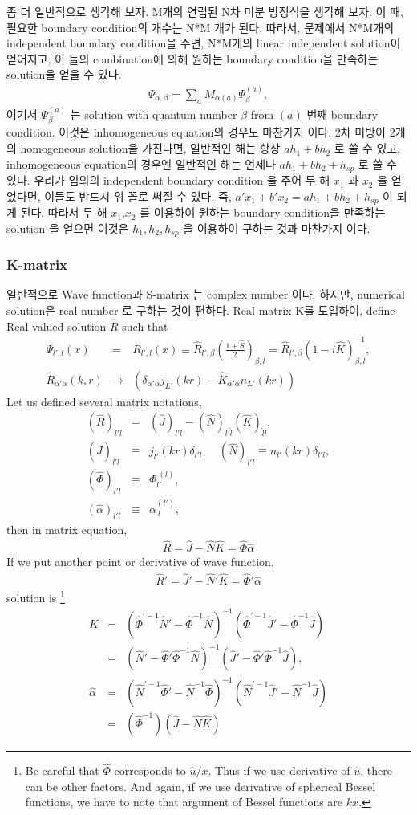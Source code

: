 \documentclass[10pt]{book}
\newcommand{\bea}{\begin{eqnarray}}
\newcommand{\eea}{\end{eqnarray}}
\newcommand{\no}{\nonumber \\}
\begin{document}
좀 더 일반적으로 생각해 보자. M개의 연립된 N차 미분 방정식을 생각해 보자. 이 때, 필요한 
boundary condition의 개수는 N*M 개가 된다. 따라서, 문제에서 N*M개의 independent boundary 
condition을 주면, N*M개의 linear independent solution이 얻어지고, 이 들의 combination에 의해
원하는 boundary condition을 만족하는 solution을 얻을 수 있다. 
\bea 
\Psi_{\alpha,\beta}=\sum_{a} M_{\alpha (a)} \Psi^{(a)}_{\beta} ,
\eea 
여기서 $\Psi^{(a)}_{\beta}$ 는 solution with quantum number $\beta $
from $(a)$ 번째 boundary condition. 
이것은 inhomogeneous equation의 경우도 마찬가지 이다. 
2차 미방이 2개의 homogeneous solution을 가진다면, 일반적인 해는 항상 
$a h_1+ b h_2$ 로 쓸 수 있고, inhomogeneous equation의 경우엔
일반적인 해는 언제나 $a h_1+ b h_2+ h_{sp}$ 로 쓸 수 있다. 
우리가 임의의 independent boundary condition 을 주어 두 해 
$x_1$ 과 $x_2$ 을 얻었다면, 이들도 반드시 위 꼴로 써질 수 있다.
즉, $a' x_1+ b' x_2=a h_1+ b h_2+ h_{sp}$ 이 되게 된다. 
따라서 두 해 $x_1$,$x_2$ 를 이용하여 원하는 boundary condition을 만족하는 
solution 을 얻으면 이것은 $h_1,h_2,h_{sp}$ 을 이용하여 구하는 것과 마찬가지 이다. 


\subsubsection{K-matrix}

일반적으로 Wave function과 
S-matrix 는 complex number 이다. 하지만, numerical solution은 
real number 로 구하는 것이 편하다. Real matrix K를 도입하여,
define Real valued solution $\hat{R}$ such that
\bea
\Psi_{l',l}(x)&=&R_{l',l}(x)\equiv\hat{R}_{l',\beta}(\frac{1+\hat{S}}{2})_{\beta,l}=\hat{R}_{l',\beta}(1-i\hat{K})^{-1}_{\beta,l},\no
\hat{R}_{\alpha'\alpha}(k, r)&\to&\left(\delta_{\alpha'\alpha}j_{L'}(kr)-\hat{K}_{\alpha'\alpha}n_{L'}(kr)\right)
\eea
Let us defined several matrix notations,
\bea
(\hat{R})_{l'l}&=&(\hat{J})_{l'l}-(\hat{N})_{l'\tilde{l}}
                                  (\hat{K})_{\tilde{l} l},\no
(\hat{J})_{l'l}&\equiv& j_{l'}(kr)\delta_{l'l},\quad
(\hat{N})_{l'l} \equiv n_{l'}(kr)\delta_{l'l},\no
(\hat{\Phi})_{l'l}&\equiv& \Phi_{l'}^{\ (l)},\no
(\hat{\alpha})_{l' l}&\equiv& \alpha^{(l')}_{\ l},
\eea
then in matrix equation,
\bea
\hat{R}=\hat{J}-\hat{N}\hat{K}=\hat{\Phi}\hat{\alpha}
\eea
If we put another point or derivative of wave function,
\bea
\hat{R}'=\hat{J}'-\hat{N}'\hat{K}=\hat{\Phi}'\hat{\alpha}
\eea
solution is
\footnote{
Be careful that $\hat{\Phi}$ corresponds to $\hat{u}/x$.
Thus if we use derivative of $\hat{u}$, there can be other factors.
And again, if we use derivative of spherical Bessel functions,
we have to note that argument of Bessel functions are $k x$.
}
\bea
\hat{K}&=&(\hat{\Phi}^{'-1}\hat{N}'-\hat{\Phi}^{-1}\hat{N})^{-1}
        (\hat{\Phi}^{'-1}\hat{J}'-\hat{\Phi}^{-1}\hat{J})\no  
       &=& (\hat{N}'-\hat{\Phi}' \hat{\Phi}^{-1}\hat{N})^{-1}
        (\hat{J}'- \hat{\Phi}' \hat{\Phi}^{-1}\hat{J}),\no
\hat{\alpha}&=&(\hat{N}^{'-1}\hat{\Phi}'-\hat{N}^{-1}\hat{\Phi})^{-1}
        (\hat{N}^{'-1}\hat{J}'-\hat{N}^{-1}\hat{J})\no
        &=& (\hat\Phi^{-1})(\hat{J}-\hat{N}\hat{K})
\eea
\end{document}
